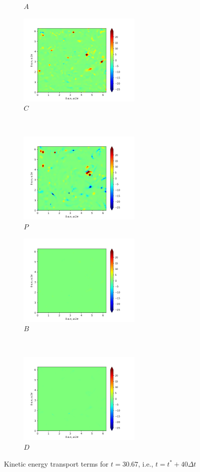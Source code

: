 \begin{figure}[H]
\begin{subfigure}{0.45\textwidth}
        \caption{$A$}
    \end{subfigure}
    \newline
    \begin{subfigure}{0.45\textwidth}
        \includegraphics[height=1.75in]{media/run-cds-65/C-ke-1380.png}
        \caption{$C$}
    \end{subfigure}
    ~
    \begin{subfigure}{0.45\textwidth}
        \includegraphics[height=1.75in]{media/run-cds-65/P-ke-1380.png}
        \caption{$P$}
    \end{subfigure}
    \newline
    \begin{subfigure}{0.45\textwidth}
        \includegraphics[height=1.75in]{media/run-cds-65/B-ke-1380.png}
        \caption{$B$}
    \end{subfigure}
    ~
    \begin{subfigure}{0.45\textwidth}
        \includegraphics[height=1.75in]{media/run-cds-65/D-ke-1380.png}
        \caption{$D$}
    \end{subfigure}
    \caption{Kinetic energy transport terms for $t=30.67$, i.e., $t=t^{\ast} + 40 \Delta t$}
\end{figure}
